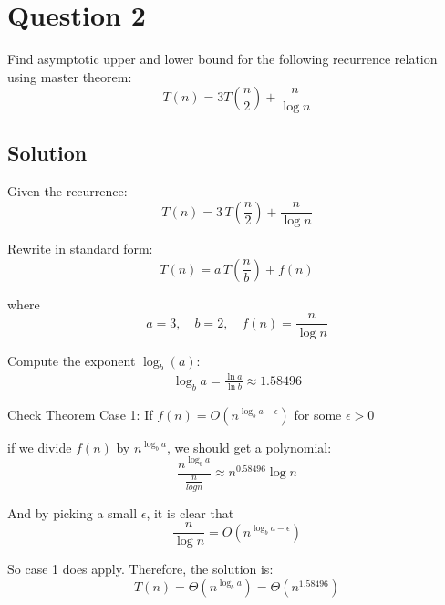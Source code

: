 \documentclass{article}
\begin{document}
\section*{Question 2}
Find asymptotic upper and lower bound for the following recurrence relation using master theorem:
\[
T(n) = 3T(\frac{n}{2}) + \frac{n}{\log n}
\]

\subsection*{Solution}
Given the recurrence:
\[
T(n) = 3\, T\left( \frac{n}{2} \right) + \frac{n}{\log n}
\]

\noindent
Rewrite in standard form:
\[
T(n) = a\, T\left( \frac{n}{b} \right) + f(n)
\]

\noindent
where
\[
a = 3, \quad b = 2, \quad f(n) = \frac{n}{\log n}
\]

\noindent
Compute the exponent \( \log_b(a) \):
\begin{align*}
\log_b a = \frac{\ln a}{\ln b} \approx 1.58496
\end{align*}

\noindent
Check Theorem Case 1: If \( f(n) = O(n^{\log_b a - \epsilon}) \) for some \( \epsilon > 0 \) 

if we divide \( f(n) \) by \( n^{\log_b a} \), we should get a polynomial:
\[
\frac{n^{\log_b a}}{\frac{n}{log n}} \approx n^{0.58496} \log n
\]

And by picking a small \(\epsilon\), it is clear that \[
\frac{n}{\log n} = O(n^{\log_b a - \epsilon})
\]

So case 1 does apply. Therefore, the solution is:
\[
T(n) = \Theta(n^{\log_b a}) = \Theta(n^{1.58496})
\]
\end{document}
